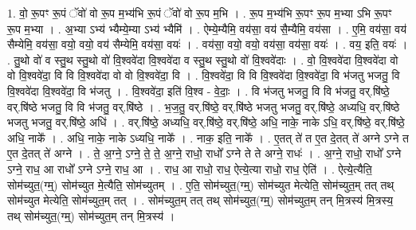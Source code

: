 \documentclass[17pt]{extarticle}
\begin{document}
1. वो॒ रू॒पꣳ रू॒पं ॅवो॑ वो रू॒प म॒भ्य॑भि रू॒पं ॅवो॑ वो रू॒प म॒भि । . रू॒प म॒भ्य॑भि रू॒पꣳ रू॒प म॒भ्या ऽभि रू॒पꣳ रू॒प म॒भ्या । . अ॒भ्या ऽभ्य॑ भ्यैम्ये॒म्या ऽभ्य॑ भ्यैमि॑ । . ऐम्ये॒म्यैमि॒ वय॑सा॒ वय॑ सै॒म्यैमि॒ वय॑सा । . ए॒मि॒ वय॑सा॒ वय॑ सैम्येमि॒ वय॑सा॒ वयो॒ वयो॒ वय॑ सैम्येमि॒ वय॑सा॒ वयः॑ । . वय॑सा॒ वयो॒ वयो॒ वय॑सा॒ वय॑सा॒ वयः॑ । . वय॒ इति॒ वयः॑ । . तु॒थो वो॑ व स्तु॒थ स्तु॒थो वो॑ वि॒श्ववे॑दा वि॒श्ववे॑दा व स्तु॒थ स्तु॒थो वो॑ वि॒श्ववे॑दाः । . वो॒ वि॒श्ववे॑दा वि॒श्ववे॑दा वो वो वि॒श्ववे॑दा॒ वि वि वि॒श्ववे॑दा वो वो वि॒श्ववे॑दा॒ वि । . वि॒श्ववे॑दा॒ वि वि वि॒श्ववे॑दा वि॒श्ववे॑दा॒ वि भ॑जतु भजतु॒ वि वि॒श्ववे॑दा वि॒श्ववे॑दा॒ वि भ॑जतु । . वि॒श्ववे॑दा॒ इति॑ वि॒श्व - वे॒दाः॒ । . वि भ॑जतु भजतु॒ वि वि भ॑जतु॒ वर्.षि॑ष्ठे॒ वर्.षि॑ष्ठे भजतु॒ वि वि भ॑जतु॒ वर्.षि॑ष्ठे । . भ॒ज॒तु॒ वर्.षि॑ष्ठे॒ वर्.षि॑ष्ठे भजतु भजतु॒ वर्.षि॑ष्ठे॒ अध्यधि॒ वर्.षि॑ष्ठे भजतु भजतु॒ वर्.षि॑ष्ठे॒ अधि॑ । . वर्.षि॑ष्ठे॒ अध्यधि॒ वर्.षि॑ष्ठे॒ वर्.षि॑ष्ठे॒ अधि॒ नाके॒ नाके ऽधि॒ वर्.षि॑ष्ठे॒ वर्.षि॑ष्ठे॒ अधि॒ नाके᳚ । . अधि॒ नाके॒ नाके ऽध्यधि॒ नाके᳚ । . नाक॒ इति॒ नाके᳚ । . ए॒तत् ते॑ त ए॒त दे॒तत् ते॑ अग्ने ऽग्ने त ए॒त दे॒तत् ते॑ अग्ने । . ते॒ अ॒ग्ने॒ ऽग्ने॒ ते॒ ते॒ अ॒ग्ने॒ राधो॒ राधो᳚ ऽग्ने ते ते अग्ने॒ राधः॑ । . अ॒ग्ने॒ राधो॒ राधो᳚ ऽग्ने ऽग्ने॒ राध॒ आ राधो᳚ ऽग्ने ऽग्ने॒ राध॒ आ । . राध॒ आ राधो॒ राध॒ ऐत्ये॒त्या राधो॒ राध॒ ऐति॑ । . ऐत्ये॒त्यैति॒ सोम॑च्युत॒(ग्म्॒) सोम॑च्युत मे॒त्यैति॒ सोम॑च्युतम् । . ए॒ति॒ सोम॑च्युत॒(ग्म्॒) सोम॑च्युत मेत्येति॒ सोम॑च्युत॒म् तत् तथ् सोम॑च्युत मेत्येति॒ सोम॑च्युत॒म् तत् । . सोम॑च्युत॒म् तत् तथ् सोम॑च्युत॒(ग्म्॒) सोम॑च्युत॒म् तन् मि॒त्रस्य॑ मि॒त्रस्य॒ तथ् सोम॑च्युत॒(ग्म्॒) सोम॑च्युत॒म् तन् मि॒त्रस्य॑ । \newline
\end{document}
